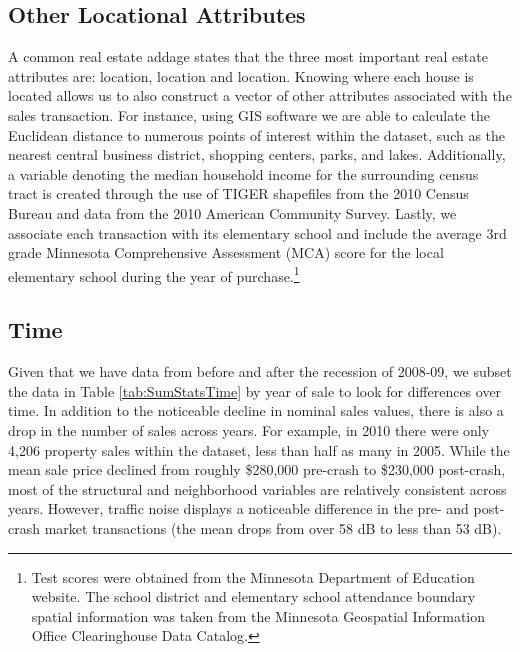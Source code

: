 \documentclass{article}\usepackage{graphicx, color}
\begin{document}
\subsection{Other Locational Attributes}
A common real estate addage states that the three most important real estate attributes are: location, location and location. Knowing where each house is located allows us to also construct a vector of other attributes associated with the sales transaction. For instance, using GIS software we are able to calculate the Euclidean distance to numerous points of interest within the dataset, such as the nearest central business district, shopping centers, parks, and lakes. Additionally, a variable denoting the median household income for the surrounding census tract is created through the use of TIGER shapefiles from the 2010 Census Bureau and data from the 2010 American Community Survey. Lastly, we associate each transaction with its elementary school and include the average 3rd grade Minnesota Comprehensive Assessment (MCA) score for the local elementary school during the year of purchase.\footnote{Test scores were obtained from the Minnesota Department of Education website. The school district and elementary school attendance boundary spatial information was taken from the Minnesota Geospatial Information Office Clearinghouse Data Catalog.} 

\subsection{Time}
Given that we have data from before and after the recession of 2008-09, we subset the data in Table \ref{tab:SumStatsTime} by year of sale to look for differences over time. In addition to the noticeable decline in nominal sales values, there is also a drop in the number of sales across years. For example, in 2010 there were only 4,206 property sales within the dataset, less than half as many in 2005. While the mean sale price declined from roughly \$280,000 pre-crash to \$230,000 post-crash, most of the structural and neighborhood variables are relatively consistent across years. However, traffic noise displays a noticeable difference in the pre- and post-crash market transactions (the mean drops from over 58 dB to less than 53 dB). 
\end{document}
